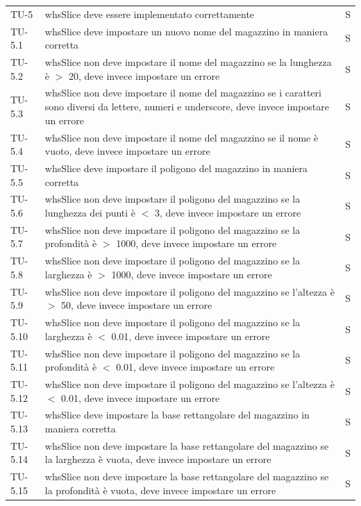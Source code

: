 \begin{xltabular}{0.9\textwidth}{X | p{0.6\textwidth} | p{0.1\textwidth} }
    TU-5 & whsSlice deve essere implementato correttamente & S\\
    TU-5.1 & whsSlice deve impostare un nuovo nome del magazzino in maniera corretta & S\\
    TU-5.2 & whsSlice non deve impostare il nome del magazzino se la lunghezza è $>$ 20, deve invece impostare un errore & S\\
    TU-5.3 & whsSlice non deve impostare il nome del magazzino se i caratteri sono diversi da lettere, numeri e underscore, deve invece impostare un errore & S\\
    TU-5.4 & whsSlice non deve impostare il nome del magazzino se il nome è vuoto, deve invece impostare un errore & S\\
    TU-5.5 & whsSlice deve impostare il poligono del magazzino in maniera corretta & S\\
    TU-5.6 & whsSlice non deve impostare il poligono del magazzino se la lunghezza dei punti è $<$ 3, deve invece impostare un errore & S\\
    TU-5.7 & whsSlice non deve impostare il poligono del magazzino se la profondità è $>$ 1000, deve invece impostare un errore & S\\
    TU-5.8 & whsSlice non deve impostare il poligono del magazzino se la larghezza è $>$ 1000, deve invece impostare un errore & S\\
    TU-5.9 & whsSlice non deve impostare il poligono del magazzino se l'altezza è $>$ 50, deve invece impostare un errore & S\\
    TU-5.10 & whsSlice non deve impostare il poligono del magazzino se la larghezza è $<$ 0.01, deve invece impostare un errore & S\\
    TU-5.11 & whsSlice non deve impostare il poligono del magazzino se la profondità è $<$ 0.01, deve invece impostare un errore & S\\
    TU-5.12 & whsSlice non deve impostare il poligono del magazzino se l'altezza è $<$ 0.01, deve invece impostare un errore & S\\
    TU-5.13 & whsSlice deve impostare la base rettangolare del magazzino in maniera corretta & S\\
    TU-5.14 & whsSlice non deve impostare la base rettangolare del magazzino se la larghezza è vuota, deve invece impostare un errore & S\\
    TU-5.15 & whsSlice non deve impostare la base rettangolare del magazzino se la profondità è vuota, deve invece impostare un errore & S\\

\end{xltabular}
